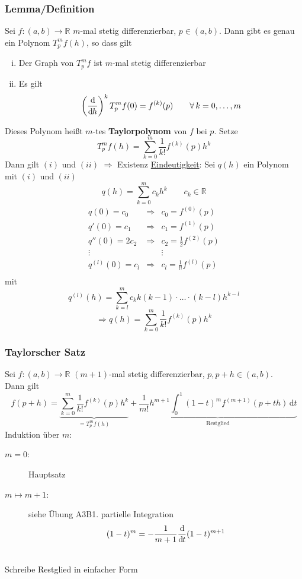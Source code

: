 \subsubsection{Lemma/Definition} %
\label{ssub:lemma_definition}
Sei $f:(a,b) \to \mathbb{R}$ $m$-mal stetig differenzierbar, $p \in (a,b)$. Dann gibt es genau ein Polynom $T_p^mf(h)$, so dass gilt
\begin{enumerate}[(i)]
	\item Der Graph von $T^m_pf$ ist $m$-mal stetig differenzierbar
	\item Es gilt
	\[
		\left( \frac{\mathrm{d}\mkern-1.0mu }{\mathrm{d}\mkern-1.0mu h}  \right)^k T_p^mf(0)= f^{(k)}(p) \qquad \forall\, k=0,\dots,m
	\]
\end{enumerate}
Dieses Polynom heißt $m$-tes {\bfseries Taylorpolynom} von $f$ bei $p$.
 Setze
\[
	T_p^mf(h)=\sum_{k=0}^{m}\frac{1}{k!}f^{(k)}(p)h^k
\]
Dann gilt $(i)$ und $(ii)$ $\Rightarrow$ Existenz
\underline{Eindeutigkeit}: Sei $q(h)$ ein Polynom mit $(i)$ und $(ii)$
\[
	q(h)= \sum_{k=0}^{m}c_kh^k \qquad c_k \in \mathbb{R}
\]
\[
	\begin{array}{ccc}
	q(0)=c_0 & \Rightarrow & c_0=f^{(0)}(p) \\
	q'(0)=c_1 & \Rightarrow & c_1=f^{(1)}(p) \\
	q''(0)=2c_2 & \Rightarrow & c_2=\frac{1}{2}f^{(2)}(p) \\
	\vdots & & \vdots \\
	q^{(l)}(0)=c_l & \Rightarrow & c_l=\frac{1}{l!}f^{(l)}(p) \\
	\end{array}
\] 
mit
\[
	q^(l)(h)= \sum_{k=l}^{m}c_kk(k-1) \cdot \dots \cdot (k-l)h^{k-l}
\]
\[
	\Rightarrow q(h)=\sum_{k=0}^{m}\frac{1}{k!}f^{(k)}(p)h^k
\] \bewende
\subsubsection{Taylorscher Satz} %
\label{taylor}
Sei $f:(a,b) \to \mathbb{R}$ $(m+1)$-mal stetig differenzierbar, $p,p+h \in (a,b)$. \\
Dann gilt
\[
	f(p+h)= \underset{= T^m_pf(h)}{\underbrace{\sum_{k=0}^{m}\frac{1}{k!}f^{(k)}(p)h^k}} 
	+ \underset{\text{Restglied}}{\underbrace{\frac{1}{m!}h^{m+1}\int_{0}^{1}(1-t)^mf^{(m+1)}(p+th) \,\mathrm{d}t}}
\]
 Induktion über $m$:
\begin{description}
	\item[$m=0$:] Hauptsatz
	\item[$m \mapsto m+1$:] siehe Übung A3B1. partielle Integration
	\[
	 (1-t)^m= - \frac{1}{m+1}\frac{\mathrm{d}\mkern-1.0mu }{\mathrm{d}\mkern-1.0mu t} (1-t)^{m+1}
	\] 
\end{description}\bewende \\
Schreibe Restglied in einfacher Form
